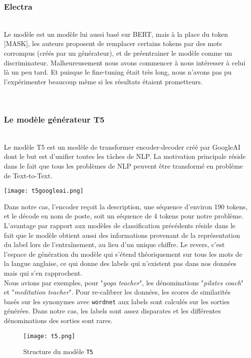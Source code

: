 \subsubsection{Electra}
\hfill\\

Le modèle   est un modèle lui aussi basé sur BERT, mais à la place du token [MASK], les auteurs proposent de remplacer certains tokens par des mots corrompus (créés par un générateur), et de préentrainer le modèle comme un discriminateur. Malheureusement nous avons commencer à nous intéresser à celui là un peu tard. Et puisque le fine-tuning était très long, nous n'avons pas pu l'expérimenter beaucoup même si les résultats étaient prometteurs.

\hfill\\
\subsubsection{Le modèle générateur T5}
\hfill\\
Le modèle T5 est un modèle de transformer encoder-decoder créé par GoogleAI dont le but est d'unifier toutes les tâches de NLP. La motivation principale réside dans le fait que tous les problèmes de NLP peuvent être transformé en problème de Text-to-Text.

\texttt{[image: t5googleai.png]}

Dans notre cas, l'encoder reçoit la description, une séquence d'environ 190 tokens, et le décode en nom de poste, soit un séquence de 4 tokens pour notre problème. L'avantage par rapport aux modèles de classification précédents réside dans le fait que le modèle obtient aussi des informations provenant de la représentation du label lors de l'entraînement, au lieu d'un unique chiffre.
Le revers, c'est l'espace de génération du modèle qui s'étend théoriquement sur tous les mots de la langue anglaise, ce qui donne des labels qui n'existent pas dans nos données mais qui s'en rapprochent.\\
Nous avions par exemples, pour "\textit{yoga teacher}", les dénominations "\textit{pilates coach}" et "\textit{meditation teacher}". Pour re-calibrer les données, les scores de similarités basés sur les synonymes avec \texttt{wordnet} aux labels sont calculés sur les sorties générées. Dans notre cas, les labels sont assez disparates et les différentes dénominations des sorties sont rares.
\begin{figure}[!htb]
\centering
\texttt{[image: t5.png]}
\caption{Structure du modèle \texttt{T5}}
\end{figure}

